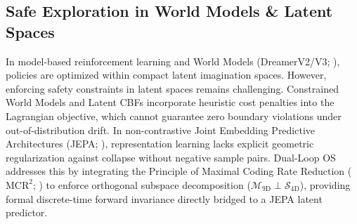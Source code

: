 \documentclass[10pt,twocolumn,letterpaper]{article}
\begin{document}
\subsection{Safe Exploration in World Models \& Latent Spaces}
In model-based reinforcement learning and World Models (DreamerV2/V3; \citealp{hafner2020mastering,hafner2023mastering}), policies are optimized within compact latent imagination spaces. However, enforcing safety constraints in latent spaces remains challenging. Constrained World Models \citep{as2022constrained} and Latent CBFs \citep{zhao2023latent} incorporate heuristic cost penalties into the Lagrangian objective, which cannot guarantee zero boundary violations under out-of-distribution drift. In non-contrastive Joint Embedding Predictive Architectures (JEPA; \citealp{lecun2022path,bardes2024vjepa}), representation learning lacks explicit geometric regularization against collapse without negative sample pairs. Dual-Loop OS addresses this by integrating the Principle of Maximal Coding Rate Reduction ($\mathrm{MCR}^2$; \citealp{yu2020learning}) to enforce orthogonal subspace decomposition ($\mathcal{M}_{9\mathrm{D}} \perp \mathcal{S}_{4\mathrm{D}}$), providing formal discrete-time forward invariance directly bridged to a JEPA latent predictor.
\end{document}
